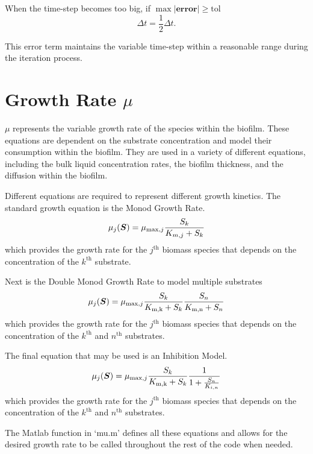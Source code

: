 \documentclass[letterpaper, twoside]{article}
\numberwithin{equation}{section}
\def\bm#1{\mbox{\boldmath{$#1$}}}
\begin{document}
When the time-step becomes too big, if $\max\left|\mathrm{\textbf{error}}\right| \geq  \mathrm{tol}$
\begin{equation}
  \Delta t = \frac{1}{2} \Delta t.
\end{equation}

This error term maintains the variable time-step within a reasonable range during the iteration process.

\section{Growth Rate $\mu$}\label{sec:mu}
$\mu$ represents the variable growth rate of the species within the biofilm. These equations are dependent on the substrate concentration and model their consumption within the biofilm. They are used in a variety of different equations, including the bulk liquid concentration rates, the biofilm thickness, and the diffusion within the biofilm.

Different equations are required to represent different growth kinetics. The standard growth equation is the Monod Growth Rate.
\begin{equation} \label{eq: MonodGrowthRate}
  \mu_j(\bm{S})=\mu_{\mathrm{max},j} \frac{S_k}{K_{m,j} + S_k}
\end{equation}
which provides the growth rate for the $j^\mathrm{th}$ biomass species that depends on the concentration of the $k^\mathrm{th}$ substrate.

Next is the Double Monod Growth Rate to model multiple substrates
\begin{equation} \label{eq: DoubleMonodGrowthRate}
  \mu_j(\bm{S})=\mu_{\mathrm{max},j} \frac{S_k}{K_\mathrm{m,k} + S_k} \frac{S_n}{K_\mathrm{m,n} + S_n}
\end{equation}
which provides the growth rate for the $j^\mathrm{th}$ biomass species that depends on the concentration of the $k^\mathrm{th}$ and $n^\mathrm{th}$ substrates.


The final equation that may be used is an Inhibition Model.
\begin{equation} \label{eq: Inhibition}
  \mu_j(\bm{S})=\mu_{\mathrm{max},j} \frac{S_k}{K_\mathrm{m,k} + S_k} \frac{1}{1 + \frac{S_n}{K_{i,n}}}
\end{equation}
which provides the growth rate for the $j^\mathrm{th}$ biomass species that depends on the concentration of the $k^\mathrm{th}$ and $n^\mathrm{th}$ substrates.

The Matlab function in `mu.m' defines all these equations and allows for the desired growth rate to be called throughout the rest of the code when needed.
  
\end{document}
